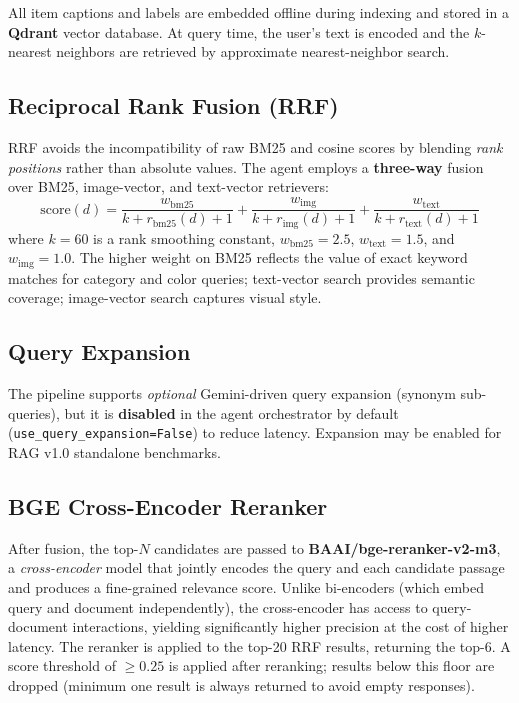 \documentclass[12pt,a4paper]{article}
\begin{document}
All item captions and labels are embedded offline during indexing
and stored in a \textbf{Qdrant} vector database.
At query time, the user's text is encoded and the $k$-nearest
neighbors are retrieved by approximate nearest-neighbor search.

\subsection{Reciprocal Rank Fusion (RRF)}

RRF avoids the incompatibility of raw BM25 and cosine scores by
blending \emph{rank positions} rather than absolute values.
The agent employs a \textbf{three-way} fusion over BM25,
image-vector, and text-vector retrievers:
\[
  \text{score}(d) =
    \frac{w_{\text{bm25}}}{k + r_{\text{bm25}}(d) + 1}
    +
    \frac{w_{\text{img}}}{k + r_{\text{img}}(d) + 1}
    +
    \frac{w_{\text{text}}}{k + r_{\text{text}}(d) + 1}
\]
where $k=60$ is a rank smoothing constant,
$w_{\text{bm25}} = 2.5$, $w_{\text{text}} = 1.5$, and
$w_{\text{img}} = 1.0$.
The higher weight on BM25 reflects the value of exact
keyword matches for category and color queries;
text-vector search provides semantic coverage;
image-vector search captures visual style.

\subsection{Query Expansion}

The pipeline supports \emph{optional} Gemini-driven query expansion
(synonym sub-queries), but it is \textbf{disabled} in the agent
orchestrator by default (\texttt{use\_query\_expansion=False}) to
reduce latency. Expansion may be enabled for RAG v1.0 standalone
benchmarks.

\subsection{BGE Cross-Encoder Reranker}

After fusion, the top-$N$ candidates are passed to
\textbf{BAAI/bge-reranker-v2-m3}, a \emph{cross-encoder} model
that jointly encodes the query and each candidate passage
and produces a fine-grained relevance score.
Unlike bi-encoders (which embed query and document independently),
the cross-encoder has access to query-document interactions,
yielding significantly higher precision at the cost of higher latency.
The reranker is applied to the top-20 RRF results, returning the top-6.
A score threshold of $\geq 0.25$ is applied after reranking;
results below this floor are dropped (minimum one result is always
returned to avoid empty responses).
\end{document}

